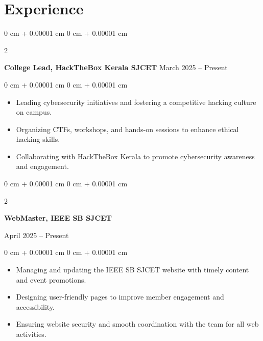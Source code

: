 \documentclass[10pt, letterpaper]{article}
\newenvironment{highlights}{
    \begin{itemize}[
        topsep=0.10 cm,
        parsep=0.10 cm,
        partopsep=0pt,
        itemsep=0pt,
        leftmargin=0 cm + 10pt
    ]
}{
    \end{itemize}
} %
\newenvironment{onecolentry}{
    \begin{adjustwidth}{
        0 cm + 0.00001 cm
    }{
        0 cm + 0.00001 cm
    }
}{
    \end{adjustwidth}
} %
\newenvironment{twocolentry}[2][]{
    \onecolentry
    \def\secondColumn{#2}
    \setcolumnwidth{\fill, 4.5 cm}
    \begin{paracol}{2}
}{
    \switchcolumn \raggedleft \secondColumn
    \end{paracol}
    \endonecolentry
} %
\begin{document}
  
    \section{Experience}

\begin{twocolentry}{
            March 2025 – Present
        }
            \textbf{College Lead, HackTheBox Kerala SJCET}\end{twocolentry}

        \vspace{0.10 cm}
        \begin{onecolentry}
            \begin{highlights}
                \item Leading cybersecurity initiatives and fostering a competitive hacking culture on campus.
                \item Organizing CTFs, workshops, and hands-on sessions to enhance ethical hacking skills.
                \item Collaborating with HackTheBox Kerala to promote cybersecurity awareness and engagement.
            \end{highlights}
        \end{onecolentry}

        \vspace{0.2 cm}

\begin{twocolentry}{
            April 2025 – Present
        }
            \textbf{WebMaster, IEEE SB SJCET}
        \end{twocolentry}

        \vspace{0.10 cm}
        \begin{onecolentry}
            \begin{highlights}
                \item Managing and updating the IEEE SB SJCET website with timely content and event promotions.
                \item Designing user-friendly pages to improve member engagement and accessibility.
                \item Ensuring website security and smooth coordination with the team for all web activities.
            \end{highlights}
        \end{onecolentry}

        \vspace{0.2 cm}
\end{document}
